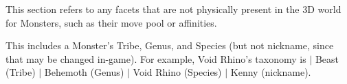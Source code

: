 
This section refers to any facets that are not physically present in the 3D world for Monsters, such as their move pool or affinities.

This includes a Monster's Tribe, Genus, and Species (but not nickname, since that may be changed in-game). For example, Void Rhino's taxonomy is $|$ Beast (Tribe) $|$ Behemoth (Genus) $|$ Void Rhino (Species) $|$ Kenny (nickname).